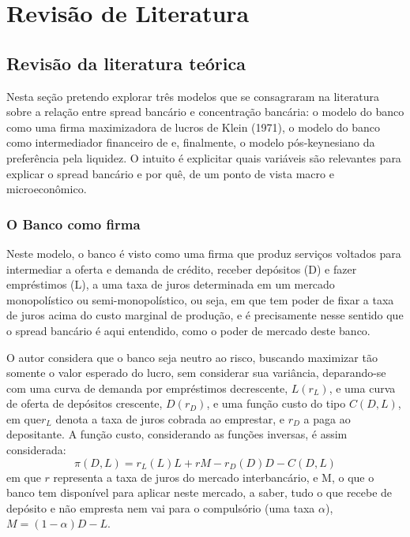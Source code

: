 \documentclass[a4paper, 12pt, openany, oneside, brazil]{abntex2}
\begin{document}
\imprimircapa
\imprimirfolhaderosto

\tableofcontents*
\cleardoublepage

\textual

\chapter{Revisão de Literatura}
\section{Revisão da literatura teórica}
	
	Nesta seção pretendo explorar três modelos que se consagraram na literatura sobre a relação entre spread bancário e concentração bancária: o modelo do banco como uma firma maximizadora de lucros de Klein (1971), o modelo do banco como intermediador financeiro de  e, finalmente, o modelo pós-keynesiano da preferência pela liquidez. O intuito é explicitar quais variáveis são relevantes para explicar o spread bancário e por quê, de um ponto de vista macro e microeconômico.
	
\subsection{O Banco como firma}
	
	Neste modelo, o banco é visto como uma firma que produz serviços voltados para intermediar a oferta e demanda de crédito, receber depósitos (D) e fazer empréstimos (L), a uma taxa de juros determinada em um mercado monopolístico ou semi-monopolístico, ou seja, em que tem poder de fixar a taxa de juros acima do custo marginal de produção, e é precisamente nesse sentido que o spread bancário é aqui entendido, como o poder de mercado deste banco. \cite{oreiro}
	
	O autor considera que o banco seja neutro ao risco, buscando maximizar tão somente o valor esperado do lucro, sem considerar sua variância, deparando-se com uma curva de demanda por empréstimos decrescente, $L(r_L)$, e uma curva de oferta de depósitos crescente, $D(r_D)$, e uma função custo do tipo $C(D, L)$, em que$ r_L$ denota a taxa de juros cobrada ao emprestar, e $r_D$ a paga ao depositante. A função custo, considerando as funções inversas, é assim considerada: \begin{equation}\pi(D, L) = r_L(L)L + rM - r_D(D)D - C(D, L)\end{equation} em que $r$ representa a taxa de juros do mercado interbancário, e M, o que o banco tem disponível para aplicar neste mercado, a saber, tudo o que recebe de depósito e não empresta nem vai para o compulsório (uma taxa $\alpha$), $M = (1 - \alpha)D - L$.
	
\end{document}
